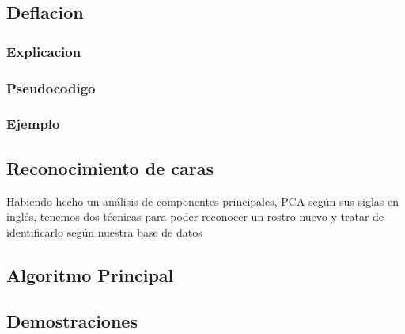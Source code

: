 \subsection{Deflacion}
  \subsubsection{Explicacion}
  
  \subsubsection{Pseudocodigo}
  
  \subsubsection{Ejemplo}
  

\subsection{Reconocimiento de caras}
Habiendo hecho un análisis de componentes principales, PCA según sus siglas en inglés, tenemos dos
técnicas para poder reconocer un rostro nuevo y tratar de identificarlo según nuestra base de datos
  


\subsection{Algoritmo Principal}


\subsection{Demostraciones}

